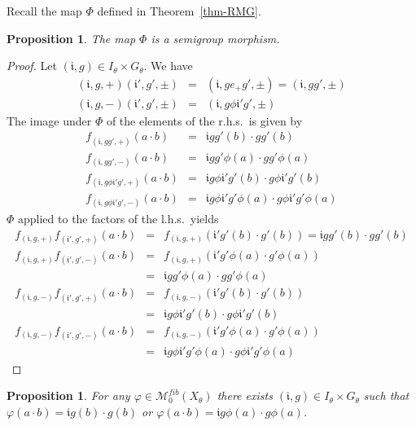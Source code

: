 \documentclass[12pt]{amsart}
\newtheorem{prop}[theorem]{Proposition}
\theoremstyle{definition}
\numberwithin{equation}{section}
\newcommand{\ii}{{\mathfrak i}}
\newcommand{\M}{\mathcal M}
\newcommand{\Sfib}{\M^{fib}_0(X_\theta)}
\begin{document}
Recall the map $\Phi$ defined in Theorem~\ref{thm-RMG}.
\begin{prop}
The map $\Phi$ is a semigroup morphism.
\end{prop}

\begin{proof}  Let $(\ii,g)\in I_\theta\times G_\theta$.
We have 
\begin{eqnarray*}
(\ii,g,+)(\ii',g',\pm) &=& (\ii,ge_+ g',\pm) = (\ii,g g',\pm)\\
(\ii,g,-)(\ii',g',\pm) &=&  (\ii,g \phi\ii' g',\pm)
\end{eqnarray*}
The image under $\Phi$ of the elements of the r.h.s.\ is given by 
\begin{eqnarray*}
f_{(\ii ,gg',+)}(a\cdot b) &=& \ii gg' (b)\cdot gg'(b)\\
f_{(\ii ,gg',-)}(a\cdot b) &=& \ii gg' \phi(a)\cdot g g'\phi(a)\\
f_{(\ii ,g\phi\ii' g',+)}(a\cdot b) &=& \ii g\phi\ii' g' (b)\cdot g \phi\ii' g'(b)\\
f_{(\ii ,g\phi\ii' g',-)}(a\cdot b) &=& \ii g\phi\ii' g' \phi(a)\cdot g \phi\ii' g'\phi(a)\end{eqnarray*}
$\Phi$ applied to the factors of the l.h.s.\ yields
\begin{eqnarray*}  f_{(\ii ,g,+)}f_{(\ii' ,g',+)}(a\cdot b)   &=& 
f_{(\ii ,g,+)}(\ii' g'(b)\cdot g'(b))= \ii gg'(b)\cdot gg'(b)\\
f_{(\ii ,g,+)}f_{(\ii' ,g',-)}(a\cdot b)   &=& 
f_{(\ii ,g,+)}(\ii' g'\phi(a)\cdot g'\phi(a))\\
& =& \ii gg'\phi(a)\cdot gg'\phi(a)\\
f_{(\ii ,g,-)}f_{(\ii' ,g',+)}(a\cdot b)   &=& 
f_{(\ii ,g,-)}(\ii' g'(b)\cdot g'(b))\\
& =& \ii g \phi \ii' g'(b)\cdot g \phi \ii' g'(b)\\
f_{(\ii ,g,-)}f_{(\ii' ,g',-)}(a\cdot b)   &=& 
f_{(\ii ,g,-)}(\ii' g'\phi(a)\cdot g'\phi(a))\\
& =& \ii g\phi\ii' g' \phi(a)\cdot g \phi\ii' g'\phi(a)\end{eqnarray*}
\end{proof}
\begin{prop}\label{prop-rueck}
For any $\varphi\in \Sfib$ there exists $(\ii,g)\in I_\theta\times G_\theta$ such that $\varphi(a\cdot b) = \ii g(b)\cdot g(b)$ or $\varphi(a\cdot b) = \ii g\phi(a)\cdot g\phi(a)$.
\end{prop}
\end{document}
